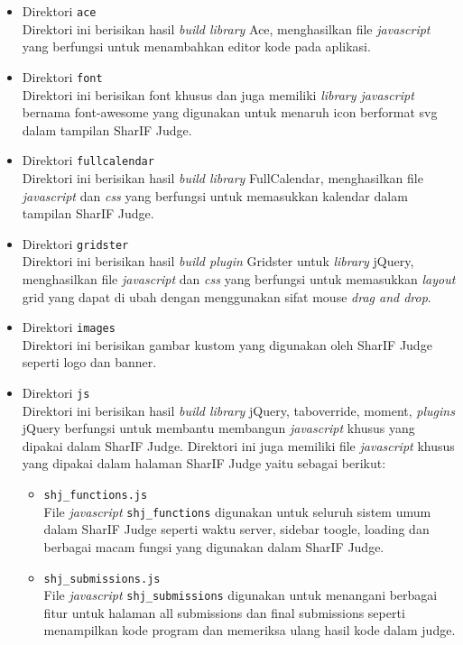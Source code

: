 \begin{itemize}
	\item Direktori \verb|ace| \\
	Direktori ini berisikan hasil \textit{build library} Ace, menghasilkan file \textit{javascript} yang berfungsi untuk menambahkan editor kode pada aplikasi.
	\item Direktori \verb|font| \\
	Direktori ini berisikan font khusus dan juga memiliki \textit{library javascript} bernama font-awesome yang digunakan untuk menaruh icon berformat svg dalam tampilan SharIF Judge. 
	\item Direktori \verb|fullcalendar| \\
	Direktori ini berisikan hasil \textit{build library} FullCalendar, menghasilkan file \textit{javascript} dan \textit{css} yang berfungsi untuk memasukkan kalendar dalam tampilan SharIF Judge.
	\item Direktori \verb|gridster| \\
	Direktori ini berisikan hasil \textit{build plugin} Gridster untuk \textit{library} jQuery, menghasilkan file \textit{javascript} dan \textit{css} yang berfungsi untuk memasukkan \textit{layout} grid yang dapat di ubah dengan menggunakan sifat mouse \textit{drag and drop}. 
	\item Direktori \verb|images| \\
	Direktori ini berisikan gambar kustom yang digunakan oleh SharIF Judge seperti logo dan banner. 
	\item Direktori \verb|js| \\
	Direktori ini berisikan hasil \textit{build library} jQuery, taboverride, moment, \textit{plugins} jQuery berfungsi untuk membantu membangun \textit{javascript} khusus yang dipakai dalam SharIF Judge. Direktori ini juga memiliki file \textit{javascript} khusus yang dipakai dalam halaman SharIF Judge yaitu sebagai berikut:
	\begin{itemize}
		\item \verb|shj_functions.js| \\
		File \textit{javascript} \verb|shj_functions| digunakan untuk seluruh sistem umum dalam SharIF Judge seperti waktu server, sidebar toogle, loading dan berbagai macam fungsi yang digunakan dalam SharIF Judge.
		\item \verb|shj_submissions.js| \\
		File \textit{javascript} \verb|shj_submissions| digunakan untuk menangani berbagai fitur untuk halaman all submissions dan final submissions seperti menampilkan kode program dan memeriksa ulang hasil kode dalam judge.

\end{itemize}
\end{itemize}
